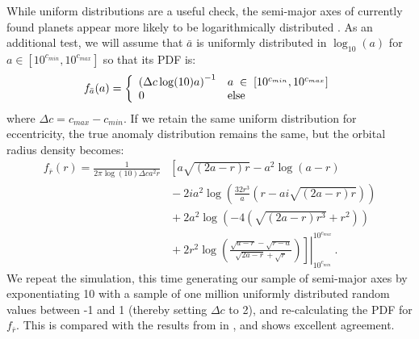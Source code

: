 While uniform distributions are a useful check, the semi-major axes of currently found planets appear more likely to be logarithmically distributed \citep{currie2009semimajor}. As an additional test, we will assume that $\bar a$ is uniformly distributed in $\log_{10}(a)$ for $a \in [10^{c_{min}}, 10^{c_{max}}]$ so that its PDF is:
\begin{equation}\label{eq:alogpdf}
f_{\bar a}(a) = \left\{
    \begin{array}{l l}
    \left(\Delta c\log(10) a\right)^{-1} &a \; \in \;  [10^{c_{min}}, 10^{c_{max}}]\\
    0 & \mathrm{else}
    \end{array}
        \right.
\end{equation}
where $\Delta c = c_{max} - c_{min}$.
If we retain the same uniform distribution for eccentricity, the true anomaly distribution remains the same, but the orbital radius density becomes:
\begin{align}
f_{\bar{r}}(r) =\frac{1}{2\pi \log(10)\Delta c a^2 r} 
& \left[a\sqrt{(2a - r)r} - a^2\log\left(a - r\right)\right.\nonumber\\
&{} - 2ia^2\log\left(\frac{32 r^3}{a}\left(r - a i \sqrt{(2a - r)r}\right)\right) \nonumber\\
& {} + 2a^2\log\left(-4\left( \sqrt{(2a - r)r^3} + r^2\right)\right)\label{eq:rpdflog}\\
&\left.\left.{} + 2r^2\log\left(\frac{\sqrt{a - r} - \sqrt{r-a}}{\sqrt{2a - r} + \sqrt{r}}\right)\right]\right|_{10^{c_{min}}}^{10^{c_{max}}}\nonumber \, .
\end{align}
We repeat the simulation, this time generating our sample of semi-major axes by exponentiating 10 with a sample of one million uniformly distributed random values between -1 and 1 (thereby setting $\Delta c$ to 2), and re-calculating the PDF for $f_{\bar r}$.  This is compared with the results from  in , and shows excellent agreement.

